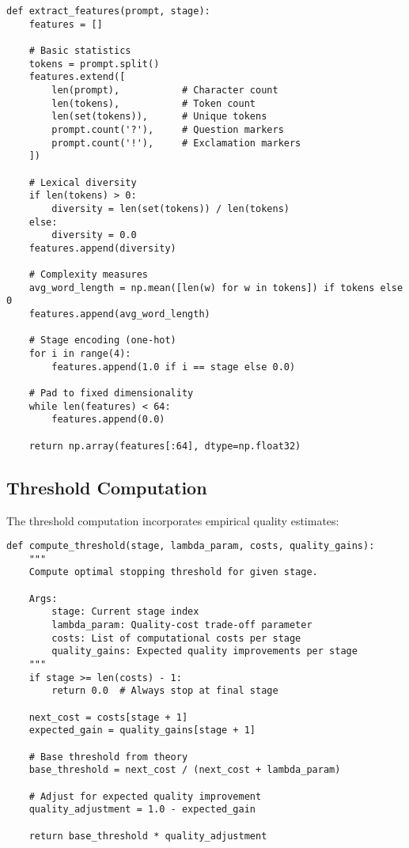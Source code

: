 \documentclass{article}
\theoremstyle{plain}
\theoremstyle{definition}
\theoremstyle{remark}
\begin{document}
\begin{verbatim}
def extract_features(prompt, stage):
    features = []
    
    # Basic statistics
    tokens = prompt.split()
    features.extend([
        len(prompt),           # Character count
        len(tokens),           # Token count
        len(set(tokens)),      # Unique tokens
        prompt.count('?'),     # Question markers
        prompt.count('!'),     # Exclamation markers
    ])
    
    # Lexical diversity
    if len(tokens) > 0:
        diversity = len(set(tokens)) / len(tokens)
    else:
        diversity = 0.0
    features.append(diversity)
    
    # Complexity measures
    avg_word_length = np.mean([len(w) for w in tokens]) if tokens else 0
    features.append(avg_word_length)
    
    # Stage encoding (one-hot)
    for i in range(4):
        features.append(1.0 if i == stage else 0.0)
    
    # Pad to fixed dimensionality
    while len(features) < 64:
        features.append(0.0)
    
    return np.array(features[:64], dtype=np.float32)
\end{verbatim}

\subsection{Threshold Computation}

The threshold computation incorporates empirical quality estimates:

\begin{verbatim}
def compute_threshold(stage, lambda_param, costs, quality_gains):
    """
    Compute optimal stopping threshold for given stage.
    
    Args:
        stage: Current stage index
        lambda_param: Quality-cost trade-off parameter
        costs: List of computational costs per stage
        quality_gains: Expected quality improvements per stage
    """
    if stage >= len(costs) - 1:
        return 0.0  # Always stop at final stage
    
    next_cost = costs[stage + 1]
    expected_gain = quality_gains[stage + 1]
    
    # Base threshold from theory
    base_threshold = next_cost / (next_cost + lambda_param)
    
    # Adjust for expected quality improvement
    quality_adjustment = 1.0 - expected_gain
    
    return base_threshold * quality_adjustment
\end{verbatim}
\end{document}
